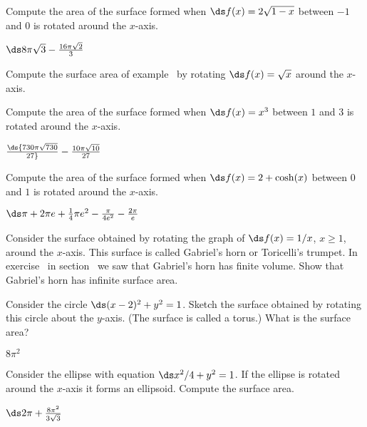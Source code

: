 \begin{exercises}

\begin{exercise} Compute the area of the surface formed when $\ds f(x)=2\sqrt{1-x}$
between $-1$ and $0$ is rotated around the $x$-axis.
\begin{answer} $\ds 8\pi\sqrt3-{16\pi\sqrt2\over 3}$
\end{answer}\end{exercise}

\begin{exercise} Compute the surface area of example~ by rotating $\ds f(x)=\sqrt x$ around the $x$-axis.

\begin{exercise} Compute the area of the surface formed when 
$\ds f(x)=x^3$ between $1$ and $3$ is rotated around the $x$-axis.
\begin{answer} $\ds {730\pi\sqrt{730}\over27}-{10\pi\sqrt{10}\over 27}$
\end{answer}\end{exercise}

\begin{exercise} Compute the area of the surface formed when 
$\ds f(x)=2 +\cosh (x)$ between $0$ and $1$ is rotated around the
  $x$-axis.
\begin{answer} $\ds \pi +2\pi e+ {1\over4}\pi e^2-{\pi\over4e^2}-{2\pi\over e}$
\end{answer}\end{exercise}

\begin{exercise} Consider the surface obtained by rotating the graph of $\ds
f(x)=1/x$, $x\geq 1$, around the $x$-axis. This surface is called
{\dfont Gabriel's horn\/} or {\dfont Toricelli's
  trumpet}.  
In exercise~ in 
section~ we saw that Gabriel's horn has
finite volume. 
Show that Gabriel's horn has
infinite surface area.

\begin{exercise} Consider the circle $\ds (x-2)^2+y^2 = 1$. Sketch the
surface obtained by rotating this circle about the $y$-axis. (The
surface is called a {\dfont torus}.) What is the surface area?
\begin{answer} $8\pi^2$
\end{answer}\end{exercise}

\begin{exercise} Consider the ellipse with equation $\ds x^2/4+y^2 = 1$.
If the ellipse is rotated around the $x$-axis it forms 
an {\dfont ellipsoid}.
Compute the surface area.
\begin{answer} $\ds 2\pi+{8\pi^2\over 3\sqrt{3}}$
\end{answer}\end{exercise}


\end{exercise}
\end{exercise}
\end{exercises}
